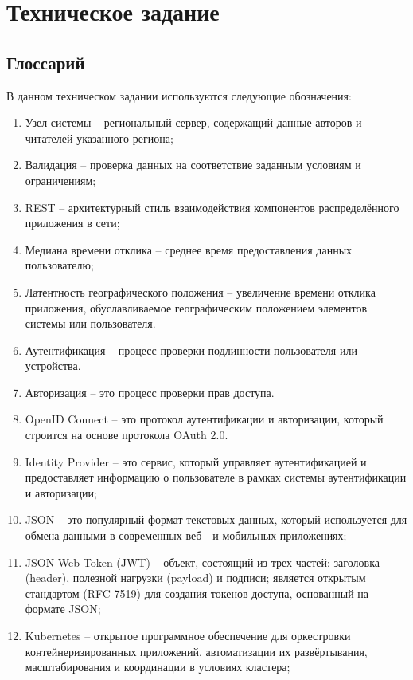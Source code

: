 \chapter*{Техническое задание}

\section*{Глоссарий}

В данном техническом задании используются следующие обозначения:
\begin{enumerate}
	\item Узел системы -- региональный сервер, содержащий данные авторов и читателей указанного региона;
	\item Валидация -- проверка данных на соответствие заданным условиям и ограничениям;
	\item REST -- архитектурный стиль взаимодействия компонентов распределённого
	приложения в сети;
	\item Медиана времени отклика -- среднее время предоставления данных пользователю;
	\item Латентность географического положения -- увеличение времени отклика приложения, обуславливаемое географическим положением элементов системы или
	пользователя.
	\item Аутентификация -- процесс проверки подлинности пользователя или устройства.
	\item Авторизация -- это процесс проверки прав доступа.
	\item OpenID Connect -- это протокол аутентификации и авторизации, который строится на основе протокола OAuth 2.0.
	\item Identity Provider -- это сервис, который управляет аутентификацией и предоставляет информацию о пользователе в рамках системы аутентификации и авторизации;
    \item JSON -- это популярный формат текстовых данных, который используется для обмена данными в современных веб - и мобильных приложениях;
    \item JSON Web Token (JWT) -- объект, состоящий из трех частей: заголовка (header), полезной нагрузки (payload) и подписи; является открытым стандартом (RFC 7519) для создания токенов доступа, основанный на формате JSON;
    \item Kubernetes -- открытое программное обеспечение для оркестровки контейнеризированных приложений, автоматизации их развёртывания, масштабирования и координации в условиях кластера;

\end{enumerate}
